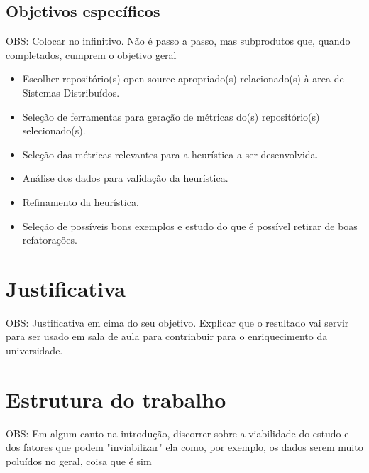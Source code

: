 \subsection{Objetivos específicos}\label{subsec:objetivosEspecificos}
OBS: Colocar no infinitivo. Não é passo a passo, mas subprodutos que, quando completados, cumprem o objetivo geral
\begin{itemize}
    \item Escolher repositório(s) open-source apropriado(s) relacionado(s) à area de Sistemas Distribuídos.
    \item Seleção de ferramentas para geração de métricas do(s) repositório(s) selecionado(s).
    \item Seleção das métricas relevantes para a heurística a ser desenvolvida.
    \item Análise dos dados para validação da heurística.
    \item Refinamento da heurística.
    \item Seleção de possíveis bons exemplos e estudo do que é possível retirar de boas refatoraçôes.
\end{itemize}

\section{Justificativa}\label{sec:justificativa}
OBS: Justificativa em cima do seu objetivo.
Explicar que o resultado vai servir para ser usado em sala de aula para contrinbuir para o enriquecimento da universidade.

\section{Estrutura do trabalho}\label{sec:estruturaTrabalho}

OBS: Em algum canto na introdução, discorrer sobre a viabilidade do estudo e dos fatores que podem "inviabilizar" ela como, por exemplo, os dados serem muito poluídos no geral, coisa que é sim